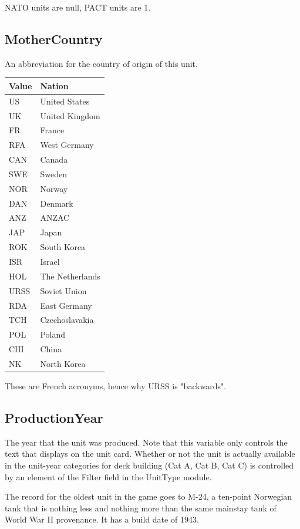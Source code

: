 \documentclass{article}
\begin{document}
NATO units are null, PACT units are 1.

\subsection{MotherCountry}

An abbreviation for the country of origin of this unit.

\begin{center}
    \begin{tabular}{ | l | l |}
    \hline
	Value & Nation\\ \hline
	US & United States\\
	UK & United Kingdom\\
	FR & France\\
	RFA & West Germany\\
	CAN & Canada\\
	SWE & Sweden\\
	NOR & Norway\\
	DAN & Denmark\\
	ANZ & ANZAC\\
	JAP & Japan\\
	ROK & South Korea\\
	ISR & Israel\\
	HOL & The Netherlands\\
	URSS & Soviet Union\\
	RDA & East Germany\\
	TCH & Czechoslavakia\\
	POL & Poland\\
	CHI & China\\
	NK & North Korea\\
    \hline
    \end{tabular}
\end{center}

These are French acronyms, hence why URSS is "backwards".

\subsection{ProductionYear}

The year that the unit was produced. Note that this variable only controls the text that displays on the unit card. Whether or not the unit is actually available in the unit-year categories for deck building (Cat A, Cat B, Cat C) is controlled by an element of the Filter field in the UnitType module.

The record for the oldest unit in the game goes to M-24, a ten-point Norwegian tank that is nothing less and nothing more than the same mainstay tank of World War II provenance. It has a build date of 1943.
\end{document}
